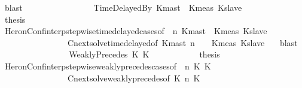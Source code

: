\begin{isabellebody}
\ blast\isanewline
\ \ \ \ \ \ \isamarkupfalse%
\isanewline
\ \ \ \ \ \ \ \ \isamarkupfalse%
\ {\isacharparenleft}TimeDelayedBy\ Kmast\ {\isasymtau}\ Kmeas\ Kslave{\isacharparenright}\isanewline
\ \ \ \ \ \ \ \ \isamarkupfalse%
\ {\isacharquery}thesis\isanewline
\ \ \ \ \ \ \ \ \ \ \isamarkupfalse%
\ HeronConf{\isacharunderscore}interp{\isacharunderscore}stepwise{\isacharunderscore}timedelayed{\isacharunderscore}cases{\isacharbrackleft}of\ {\isacartoucheopen}{\isasymGamma}{\isacartoucheclose}\ {\isacartoucheopen}n{\isacartoucheclose}\ {\isacartoucheopen}Kmast{\isacartoucheclose}\ {\isacartoucheopen}{\isasymtau}{\isacartoucheclose}\ {\isacartoucheopen}Kmeas{\isacartoucheclose}\ {\isacartoucheopen}Kslave{\isacartoucheclose}\ {\isacartoucheopen}{\isasymPsi}{\isacartoucheclose}\ {\isacartoucheopen}{\isasymPhi}{\isacartoucheclose}{\isacharbrackright}\isanewline
\ \ \ \ \ \ \ \ \ \ \ \ \ \ \ \ Cnext{\isacharunderscore}solve{\isacharunderscore}timedelayed{\isacharbrackleft}of\ {\isacartoucheopen}Kmast{\isacartoucheclose}\ {\isacartoucheopen}n{\isacartoucheclose}\ {\isacartoucheopen}{\isasymGamma}{\isacartoucheclose}\ {\isacartoucheopen}{\isasymPsi}{\isacartoucheclose}\ {\isacartoucheopen}{\isasymtau}{\isacartoucheclose}\ {\isacartoucheopen}Kmeas{\isacartoucheclose}\ {\isacartoucheopen}Kslave{\isacartoucheclose}\ {\isacartoucheopen}{\isasymPhi}{\isacartoucheclose}{\isacharbrackright}\ \isamarkupfalse%
\ blast\isanewline
\ \ \ \ \ \ \isamarkupfalse%
\isanewline
\ \ \ \ \ \ \ \ \isamarkupfalse%
\ {\isacharparenleft}WeaklyPrecedes\ K{}\ K{}{\isacharparenright}\isanewline
\ \ \ \ \ \ \ \ \isamarkupfalse%
\ \isamarkupfalse%
\ {\isacharquery}thesis\isanewline
\ \ \ \ \ \ \ \ \ \ \isamarkupfalse%
\ HeronConf{\isacharunderscore}interp{\isacharunderscore}stepwise{\isacharunderscore}weakly{\isacharunderscore}precedes{\isacharunderscore}cases{\isacharbrackleft}of\ {\isacartoucheopen}{\isasymGamma}{\isacartoucheclose}\ {\isacartoucheopen}n{\isacartoucheclose}\ {\isacartoucheopen}K{}{\isacartoucheclose}\ {\isacartoucheopen}K{}{\isacartoucheclose}\ {\isacartoucheopen}{\isasymPsi}{\isacartoucheclose}\ {\isacartoucheopen}{\isasymPhi}{\isacartoucheclose}{\isacharbrackright}\isanewline
\ \ \ \ \ \ \ \ \ \ \ \ \ \ \ \ Cnext{\isacharunderscore}solve{\isacharunderscore}weakly{\isacharunderscore}precedes{\isacharbrackleft}of\ {\isacartoucheopen}K{}{\isacartoucheclose}\ {\isacartoucheopen}n{\isacartoucheclose}\ {\isacartoucheopen}K{}{\isacartoucheclose}\ {\isacartoucheopen}{\isasymGamma}{\isacartoucheclose}\ {\isacartoucheopen}{\isasymPsi}{\isacartoucheclose}\ \ {\isacartoucheopen}{\isasymPhi}{\isacartoucheclose}{\isacharbrackright}\isanewline

\end{isabellebody}
